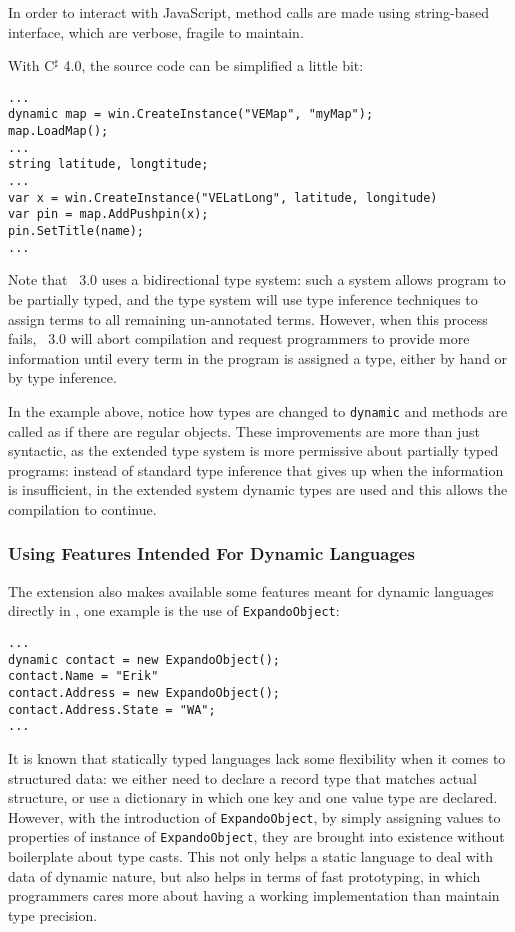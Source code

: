 In order to interact with JavaScript, method calls
are made using string-based interface, which are verbose, fragile to maintain.

With C$^\sharp$ 4.0, the source code can be simplified a little bit:

\begin{verbatim}
...
dynamic map = win.CreateInstance("VEMap", "myMap");
map.LoadMap();
...
string latitude, longtitude;
...
var x = win.CreateInstance("VELatLong", latitude, longitude)
var pin = map.AddPushpin(x);
pin.SetTitle(name);
...
\end{verbatim}

Note that \csharp\ 3.0 uses a bidirectional type system:
such a system allows program to be partially typed,
and the type system will use type inference techniques
to assign terms to all remaining un-annotated terms.
However, when this process fails, \csharp\ 3.0 will abort compilation
and request programmers to provide more information until
every term in the program is assigned a type, either by hand or by type inference.

In the example above, notice how types are changed to \texttt{dynamic} and methods are called as if there are regular objects.
These improvements are more than just syntactic,
as the extended type system is more permissive about
partially typed programs:
instead of standard type inference that gives up when
the information is insufficient, in the extended system
dynamic types are used and this allows the compilation to continue.

\subsubsection{Using Features Intended For Dynamic Languages}

The extension also makes available some features meant for dynamic languages
directly in \csharp, one example is the use of \texttt{ExpandoObject}:

\begin{verbatim}
...
dynamic contact = new ExpandoObject();
contact.Name = "Erik"
contact.Address = new ExpandoObject();
contact.Address.State = "WA";
...
\end{verbatim}

It is known that statically typed languages lack some flexibility
when it comes to structured data:
we either need to declare a record type that matches actual structure,
or use a dictionary in which one key and one value type are declared.
However, with the introduction of \texttt{ExpandoObject},
by simply assigning values to properties of instance of \texttt{ExpandoObject},
they are brought into existence without boilerplate about type casts.
This not only helps a static language to deal with data
of dynamic nature, but also helps in terms of fast prototyping,
in which programmers cares more about
having a working implementation than maintain type precision.